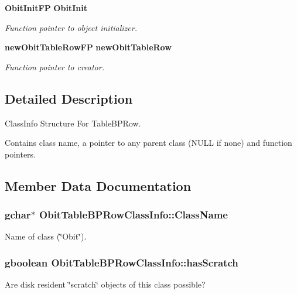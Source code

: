 \begin{CompactItemize}
{\bf Obit\-Init\-FP} {\bf Obit\-Init}
\begin{CompactList}\small\item\em Function pointer to object initializer. \item\end{CompactList}\item 
{\bf new\-Obit\-Table\-Row\-FP} {\bf new\-Obit\-Table\-Row}
\begin{CompactList}\small\item\em Function pointer to creator. \item\end{CompactList}\end{CompactItemize}


\subsection{Detailed Description}
Class\-Info Structure For Table\-BPRow. 

Contains class name, a pointer to any parent class (NULL if none) and function pointers. 



\subsection{Member Data Documentation}
\subsubsection{\setlength{\rightskip}{0pt plus 5cm}gchar$\ast$ {\bf Obit\-Table\-BPRow\-Class\-Info::Class\-Name}}\label{structObitTableBPRowClassInfo_o2}


Name of class (\char`\"{}Obit\char`\"{}). 

\subsubsection{\setlength{\rightskip}{0pt plus 5cm}gboolean {\bf Obit\-Table\-BPRow\-Class\-Info::has\-Scratch}}\label{structObitTableBPRowClassInfo_o1}


Are disk resident \char`\"{}scratch\char`\"{} objects of this class possible? 

